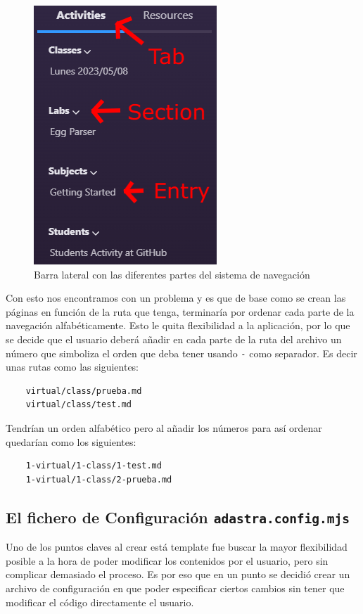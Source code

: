 \begin{figure}
    \centering
    \includegraphics{images/navigationSystem.png}
    \caption{Barra lateral con las diferentes partes del sistema de navegación}
    \label{fig:navigationSystem}
\end{figure}

Con esto nos encontramos con un problema y es que de base como se crean las páginas en función de la ruta que tenga, terminaría por ordenar cada parte de la navegación alfabéticamente. Esto le quita flexibilidad a la aplicación, por lo que se decide que el usuario deberá añadir en cada parte de la ruta del archivo un número que simboliza el orden que deba tener usando \verb|-| como separador. Es decir unas rutas como las siguientes:

\begin{verbatim}
    virtual/class/prueba.md
    virtual/class/test.md
\end{verbatim}

Tendrían un orden alfabético pero al añadir los números para así ordenar quedarían como los siguientes:

\begin{verbatim}
    1-virtual/1-class/1-test.md
    1-virtual/1-class/2-prueba.md
\end{verbatim}


\subsection{El fichero de Configuración {\tt adastra.config.mjs}} \label{diseño:data}
Uno de los puntos claves al crear está template fue buscar la mayor flexibilidad posible a la hora de poder modificar los contenidos por el usuario, pero sin complicar demasiado el proceso. Es por eso que en un punto se decidió crear un archivo de configuración en que poder especificar ciertos cambios sin tener que modificar el código directamente el usuario.

